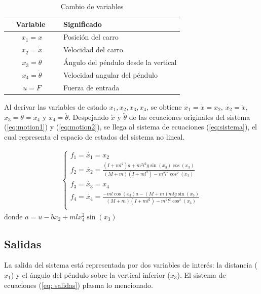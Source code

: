 \documentclass[journal]{IEEEtran}
\begin{document}
\begin{table}[!h]
\centering
\caption{Cambio de variables}
\label{my-label}
\begin{tabular}{@{}cl@{}}
\toprule
 \ \ Variable \ \ & Significado \\ \midrule
  $x_1 = x$       & Posición del carro                   \\
  $x_2 = \dot{x}$ & Velocidad del carro                  \\
  $x_3 = \theta$       & Ángulo del péndulo desde la vertical \\
  $x_4 = \dot{\theta}$ & Velocidad angular del péndulo        \\
  $u = F$       & Fuerza de entrada\\ \bottomrule
\end{tabular}
\end{table}

Al derivar las variables de estado $x_1, x_2, x_3, x_4$, se obtiene $\dot{x_1} = \dot{x} = x_2$, $\dot{x_2} = \ddot{x}$, $\dot{x_3} = \dot{\theta} = x_4$ y $\dot{x_4} = \ddot{\theta}$. Despejando $\ddot{x}$ y $\ddot{\theta}$ de las ecuaciones originales del sistema (\ref{eq:motion1}) y (\ref{eq:motion2}), se llega al sistema de ecuaciones (\ref{eq:sistema}), el cual representa el espacio de estados del sistema no lineal.

\begin{eqnarray}
  \label{eq:sistema}
  \left\{
  \begin{array}{ll}
    f_1 = \displaystyle\dot{x_1} = \displaystyle x_2 \\
    f_2 = \displaystyle\dot{x_2} =
            \displaystyle\frac{(I + ml^2)a + m^2l^2g\sin(x_3)\cos(x_3)}
              {(M + m)(I + ml^2)-m^2l^2\cos^2(x_3)}\\
    f_3 = \displaystyle\dot{x_3} = \displaystyle x_4\\
    f_4 = \dot{x_4} = \displaystyle\frac{-ml\cos(x_3)a - (M + m)mlg\sin(x_3)}
                         {(M + m)(I + ml^2) - m^2l^2\cos^2(x_3)}\\
  \end{array}
  \right.
\end{eqnarray}
donde $a = u-bx_2+mlx_4^2\sin(x_3)$

\subsection{Salidas}
La salida del sistema está representada por dos variables de interés: la distancia ($x_1$) y el ángulo del péndulo sobre la vertical inferior ($x_3$). El sistema de ecuaciones (\ref{eq: salidas}) plasma lo mencionado.  
\end{document}
